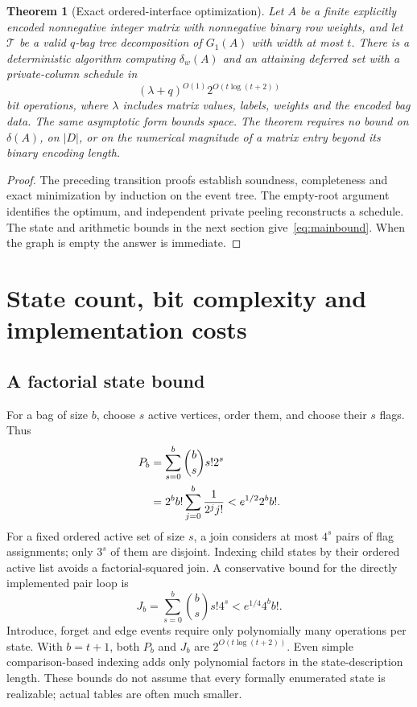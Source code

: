 \documentclass[11pt]{article}
\newtheorem{theorem}{Theorem}[section]
\theoremstyle{definition}\newtheorem{definition}[theorem]{Definition}
\theoremstyle{remark}\newtheorem{remark}[theorem]{Remark}
\begin{document}
\begin{theorem}[Exact ordered-interface optimization]
\label{thm:main}
Let $A$ be a finite explicitly encoded nonnegative integer matrix with nonnegative binary row weights, and let $\mathcal T$ be a valid $q$-bag tree decomposition of $G_1(A)$ with width at most $t$. There is a deterministic algorithm computing $\delta_w(A)$ and an attaining deferred set with a private-column schedule in
\begin{equation}
 (\lambda+q)^{O(1)}2^{O(t\log(t+2))}
 \label{eq:mainbound}
\end{equation}
bit operations, where $\lambda$ includes matrix values, labels, weights and the encoded bag data. The same asymptotic form bounds space. The theorem requires no bound on $\delta(A)$, on $|D|$, or on the numerical magnitude of a matrix entry beyond its binary encoding length.
\end{theorem}
\begin{proof}
The preceding transition proofs establish soundness, completeness and exact minimization by induction on the event tree. The empty-root argument identifies the optimum, and independent private peeling reconstructs a schedule. The state and arithmetic bounds in the next section give~\eqref{eq:mainbound}. When the graph is empty the answer is immediate.
\end{proof}

\section{State count, bit complexity and implementation costs}
\label{sec:complexity}

\subsection{A factorial state bound}
For a bag of size $b$, choose $s$ active vertices, order them, and choose their $s$ flags. Thus
\begin{align}
 P_b
 &=\sum_{s=0}^b\binom bs s!2^s\notag\\
 &=2^b b!\sum_{j=0}^b\frac{1}{2^j j!}
 < e^{1/2}2^b b!.
 \label{eq:states}
\end{align}
For a fixed ordered active set of size $s$, a join considers at most $4^s$ pairs of flag assignments; only $3^s$ of them are disjoint. Indexing child states by their ordered active list avoids a factorial-squared join. A conservative bound for the directly implemented pair loop is
\begin{equation}
 J_b=\sum_{s=0}^b\binom bs s!4^s
 <e^{1/4}4^b b!.
 \label{eq:joincount}
\end{equation}
Introduce, forget and edge events require only polynomially many operations per state. With $b=t+1$, both $P_b$ and $J_b$ are $2^{O(t\log(t+2))}$. Even simple comparison-based indexing adds only polynomial factors in the state-description length. These bounds do not assume that every formally enumerated state is realizable; actual tables are often much smaller.
\end{document}
